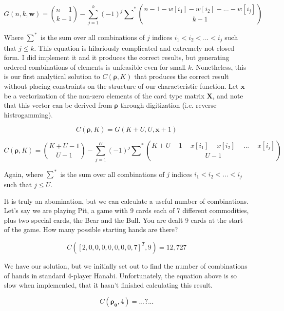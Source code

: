 \documentclass{article}
\begin{document}
\begin{equation}
    G(n, k, \bm{w}) = \binom{n - 1}{k - 1} - \sum_{j = 1}^k (-1)^j{\sum_{}^{}} ^*\binom{n - 1 - w[i_1] - w[i_2] - ... - w[i_j]}{k - 1}
\end{equation}

Where ${\sum_{}^{}} ^*$ is the sum over all combinations of $j$ indices $i_1<i_2<...<i_j$ such that $j \leq k$. This equation is hilariously complicated and extremely not closed form. I did implement it and it produces the correct results, but generating ordered combinations of elements is unfeasible even for small $k$. Nonetheless, this is our first analytical solution to $C(\bm{\rho}, K)$ that produces the correct result without placing constraints on the structure of our characteristic function. Let $\bm{x}$ be a vectorization of the non-zero elements of the card type matrix $\bm{X}$, and note that this vector can be derived from $\bm{\rho}$ through digitization (i.e. reverse histrogamming).

\begin{equation}
    C(\bm{\rho}, K) = G(K + U, U, \bm{x} + 1)
\end{equation}

\begin{equation}
    C(\bm{\rho}, K) = \binom{K + U - 1}{U - 1} - \sum_{j = 1}^U (-1)^j{\sum_{}^{}} ^*\binom{K + U - 1 - x[i_1] - x[i_2] - ... - x[i_j]}{U - 1}
\end{equation}

Again, where ${\sum_{}^{}} ^*$ is the sum over all combinations of $j$ indices $i_1<i_2<...<i_j$ such that $j \leq U$.

It is truly an abomination, but we can calculate a useful number of combinations. Let's say we are playing Pit, a game with 9 cards each of 7 different commodities, plus two special cards, the Bear and the Bull. You are dealt 9 cards at the start of the game. How many possible starting hands are there?

\begin{equation}
    C([2, 0, 0, 0, 0, 0, 0, 0, 7]^T, 9) = 12,727
\end{equation}

We have our solution, but we initially set out to find the number of combinations of hands in standard 4-player Hanabi. Unfortunately, the equation above is so slow when implemented, that it hasn't finished calculating this result.

\begin{equation}
    C(\bm{\rho_0}, 4) = ...?...
\end{equation}
\end{document}
